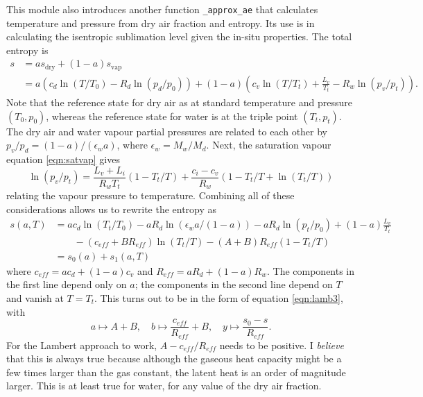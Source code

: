 \documentclass{article}
\newcommand{\vap}{\text{vap}}
\newcommand{\dry}{\text{dry}}
\newcommand{\epsw}{\epsilon_w}
\begin{document}
This module also introduces another function \texttt{\_approx\_ae} that calculates temperature and pressure from dry air fraction and entropy. Its use is in calculating the isentropic sublimation level given the in-situ properties. The total entropy is
\begin{align*}
    s &= a s_{\dry} + (1-a) s_{\vap} \\
    &= a (c_d \ln(T/T_0) - R_d \ln(p_d/p_0)) + (1-a) \left( c_v \ln(T/T_t) + \frac{L_v}{T_t} - R_w \ln(p_v/p_t) \right).
\end{align*}
Note that the reference state for dry air as at standard temperature and pressure $(T_0,p_0)$, whereas the reference state for water is at the triple point $(T_t,p_t)$. The dry air and water vapour partial pressures are related to each other by $p_v/p_d = (1-a)/(\epsw a)$, where $\epsw = M_w/M_d$. Next, the saturation vapour equation \ref{eqn:satvap} gives
\begin{equation*}
    \ln(p_v/p_t) = \frac{L_v + L_i}{R_w T_t} (1 - T_t/T) + \frac{c_i - c_v}{R_w} (1 - T_t/T + \ln(T_t/T))
\end{equation*}
relating the vapour pressure to temperature. Combining all of these considerations allows us to rewrite the entropy as
\begin{align*}
    s(a,T) &= a c_d \ln(T_t/T_0) - a R_d \ln(\epsw a/(1-a)) - a R_d \ln(p_t/p_0) + (1-a) \frac{L_v}{T_t} \\
    &\qquad - (c_{eff} + B R_{eff}) \ln(T_t/T) - (A+B) R_{eff} (1 - T_t/T) \\
    &= s_0(a) + s_1(a,T)
\end{align*}
where $c_{eff} = a c_d + (1-a) c_v$ and $R_{eff} = a R_d + (1-a) R_w$. The components in the first line depend only on $a$; the components in the second line depend on $T$ and vanish at $T=T_t$. This turns out to be in the form of equation \ref{eqn:lamb3}, with
\begin{equation*}
    a \mapsto A+B, \quad b \mapsto \frac{c_{eff}}{R_{eff}} + B, \quad y \mapsto \frac{s_0 - s}{R_{eff}}.
\end{equation*}
For the Lambert approach to work, $A-c_{eff}/R_{eff}$ needs to be positive. I {\textit{believe}} that this is always true because although the gaseous heat capacity might be a few times larger than the gas constant, the latent heat is an order of magnitude larger. This is at least true for water, for any value of the dry air fraction.
\end{document}
